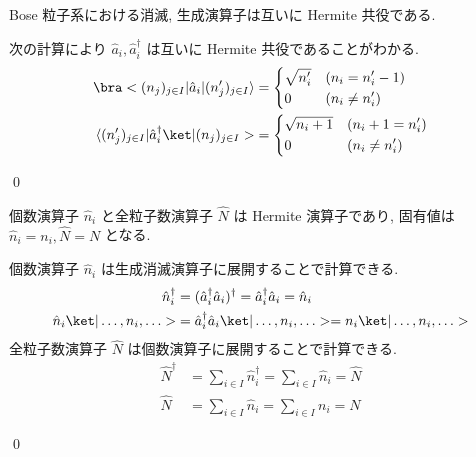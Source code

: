 \documentclass[uplatex,dvipdfmx,a4paper,11pt]{jlreq}
\makeatletter
\numberwithin{equation}{section}
\theoremstyle{definition}
\renewenvironment{proof}[1][\proofname]{\par
  \normalfont
  \topsep6\p@\@plus6\p@ \trivlist
  \item[\hskip\labelsep{\bfseries #1}\@addpunct{\bfseries}]\ignorespaces\quad\par
}{
  \qed\endtrivlist\@endpefalse
}
\renewcommand\proofname{証明}
\makeatother
\begin{document}
\begin{proposition}[Q21-38]
  Bose 粒子系における消滅, 生成演算子は互いに Hermite 共役である.
\end{proposition}
\begin{proof}
  次の計算により $\hat{a}_i, \hat{a}_i^\dagger$ は互いに Hermite 共役であることがわかる.
  \begin{align}
    \bra<(n_j)_{j\in I}|\hat{a}_i|(n_j')_{j\in I}\rangle         & = \begin{dcases}
                                                                       \sqrt{n_i'} & (n_i = n_i' - 1) \\
                                                                       0           & (n_i \neq n_i')
                                                                     \end{dcases}    \\
    \langle(n_j')_{j\in I}|\hat{a}_i^\dagger\ket|(n_j)_{j\in I}> & = \begin{dcases}
                                                                       \sqrt{n_i + 1} & (n_i + 1 = n_i') \\
                                                                       0              & (n_i \neq n_i')
                                                                     \end{dcases}
  \end{align}
\end{proof}

\begin{proposition}[Q21-39]
  個数演算子 $\hat{n}_i$ と全粒子数演算子 $\hat{N}$ は Hermite 演算子であり, 固有値は $\hat{n}_i = n_i, \hat{N} = N$ となる.
\end{proposition}
\begin{proof}
  個数演算子 $\hat{n}_i$ は生成消滅演算子に展開することで計算できる.
  \begin{align}
    \hat{n}_i^\dagger                & = (\hat{a}_i^\dagger\hat{a}_i)^\dagger = \hat{a}_i^\dagger\hat{a}_i = \hat{n}_i  \\
    \hat{n}_i\ket|\ldots,n_i,\ldots> & = \hat{a}_i^\dagger\hat{a}_i\ket|\ldots,n_i,\ldots> = n_i\ket|\ldots,n_i,\ldots>
  \end{align}
  全粒子数演算子 $\hat{N}$ は個数演算子に展開することで計算できる.
  \begin{align}
    \hat{N}^\dagger & = \sum_{i\in I}\hat{n}_i^\dagger = \sum_{i\in I}\hat{n}_i = \hat{N} \\
    \hat{N}         & = \sum_{i\in I}\hat{n}_i = \sum_{i\in I}n_i = N
  \end{align}
\end{proof}
\end{document}
